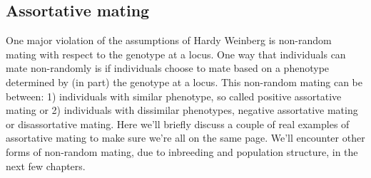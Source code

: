 {{%





\subsection{Assortative mating}
One major violation of the assumptions of Hardy Weinberg is
non-random mating with respect to the genotype at a locus. One way
that individuals can mate non-randomly is if individuals choose to mate
based on a phenotype determined by (in part) the genotype at a
locus. This non-random mating can be between:
1) individuals with similar phenotype, so called positive assortative
mating or 2) individuals with dissimilar phenotypes, negative assortative mating or disassortative
mating. Here we'll briefly discuss a couple of real examples of
assortative mating to make sure we're all on the same page. 
We'll encounter other forms of non-random mating, due to inbreeding
and population structure, in the next few chapters. 




}}
